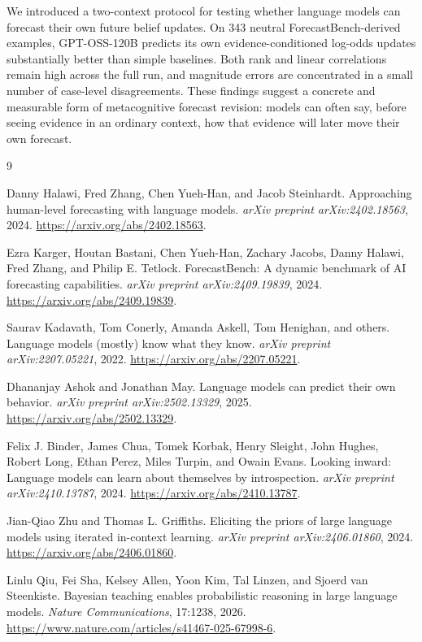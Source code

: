 \documentclass[11pt]{article}
\begin{document}
We introduced a two-context protocol for testing whether language models can
forecast their own future belief updates. On 343 neutral ForecastBench-derived
examples, GPT-OSS-120B predicts its own evidence-conditioned log-odds updates
substantially better than simple baselines. Both rank and linear correlations remain high across
the full run, and magnitude errors are concentrated in a small number of
case-level disagreements. These findings suggest a concrete and measurable form of
metacognitive forecast revision: models can often say, before seeing evidence
in an ordinary context, how that evidence will later move their own forecast.

\begin{thebibliography}{9}

Danny Halawi, Fred Zhang, Chen Yueh-Han, and Jacob Steinhardt.
\newblock Approaching human-level forecasting with language models.
\newblock \emph{arXiv preprint arXiv:2402.18563}, 2024.
\newblock \url{https://arxiv.org/abs/2402.18563}.

Ezra Karger, Houtan Bastani, Chen Yueh-Han, Zachary Jacobs, Danny Halawi,
Fred Zhang, and Philip E. Tetlock.
\newblock ForecastBench: A dynamic benchmark of AI forecasting capabilities.
\newblock \emph{arXiv preprint arXiv:2409.19839}, 2024.
\newblock \url{https://arxiv.org/abs/2409.19839}.

Saurav Kadavath, Tom Conerly, Amanda Askell, Tom Henighan, and others.
\newblock Language models (mostly) know what they know.
\newblock \emph{arXiv preprint arXiv:2207.05221}, 2022.
\newblock \url{https://arxiv.org/abs/2207.05221}.

Dhananjay Ashok and Jonathan May.
\newblock Language models can predict their own behavior.
\newblock \emph{arXiv preprint arXiv:2502.13329}, 2025.
\newblock \url{https://arxiv.org/abs/2502.13329}.

Felix J. Binder, James Chua, Tomek Korbak, Henry Sleight, John Hughes,
Robert Long, Ethan Perez, Miles Turpin, and Owain Evans.
\newblock Looking inward: Language models can learn about themselves by
introspection.
\newblock \emph{arXiv preprint arXiv:2410.13787}, 2024.
\newblock \url{https://arxiv.org/abs/2410.13787}.

Jian-Qiao Zhu and Thomas L. Griffiths.
\newblock Eliciting the priors of large language models using iterated
in-context learning.
\newblock \emph{arXiv preprint arXiv:2406.01860}, 2024.
\newblock \url{https://arxiv.org/abs/2406.01860}.

Linlu Qiu, Fei Sha, Kelsey Allen, Yoon Kim, Tal Linzen, and Sjoerd van
Steenkiste.
\newblock Bayesian teaching enables probabilistic reasoning in large language
models.
\newblock \emph{Nature Communications}, 17:1238, 2026.
\newblock \url{https://www.nature.com/articles/s41467-025-67998-6}.

\end{thebibliography}
\end{document}
